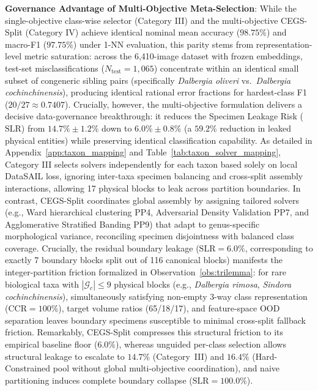 \documentclass[a4paper,fleqn]{cas-sc}
\begin{document}
\textbf{Governance Advantage of Multi-Objective Meta-Selection}: While the single-objective class-wise selector (Category III) and the multi-objective CEGS-Split (Category IV) achieve identical nominal mean accuracy ($98.75\%$) and macro-F1 ($97.75\%$) under 1-NN evaluation, this parity stems from representation-level metric saturation: across the 6,410-image dataset with frozen embeddings, test-set misclassifications ($N_{\text{test}} = 1{,}065$) concentrate within an identical small subset of congeneric sibling pairs (specifically \textit{Dalbergia oliveri} vs.\ \textit{Dalbergia cochinchinensis}), producing identical rational error fractions for hardest-class F1 ($20/27 \approx 0.7407$). Crucially, however, the multi-objective formulation delivers a decisive data-governance breakthrough: it reduces the Specimen Leakage Risk ($\mathrm{SLR}$) from $14.7\% \pm 1.2\%$ down to $6.0\% \pm 0.8\%$ (a $59.2\%$ reduction in leaked physical entities) while preserving identical classification capability. As detailed in Appendix~\ref{app:taxon_mapping} and Table~\ref{tab:taxon_solver_mapping}, Category III selects solvers independently for each taxon based solely on local DataSAIL loss, ignoring inter-taxa specimen balancing and cross-split assembly interactions, allowing 17 physical blocks to leak across partition boundaries. In contrast, CEGS-Split coordinates global assembly by assigning tailored solvers (e.g., Ward hierarchical clustering PP4, Adversarial Density Validation PP7, and Agglomerative Stratified Banding PP9) that adapt to genus-specific morphological variance, reconciling specimen disjointness with balanced class coverage. Crucially, the residual boundary leakage ($\mathrm{SLR} = 6.0\%$, corresponding to exactly 7 boundary blocks split out of 116 canonical blocks) manifests the integer-partition friction formalized in Observation~\ref{obs:trilemma}: for rare biological taxa with $|\mathcal{G}_c| \le 9$ physical blocks (e.g., \textit{Dalbergia rimosa}, \textit{Sindora cochinchinensis}), simultaneously satisfying non-empty 3-way class representation ($\mathrm{CCR}=100\%$), target volume ratios (65/18/17), and feature-space OOD separation leaves boundary specimens susceptible to minimal cross-split fallback friction. Remarkably, CEGS-Split compresses this structural friction to its empirical baseline floor ($6.0\%$), whereas unguided per-class selection allows structural leakage to escalate to $14.7\%$ (Category~III) and $16.4\%$ (Hard-Constrained pool without global multi-objective coordination), and naive partitioning induces complete boundary collapse ($\mathrm{SLR} = 100.0\%$).
\end{document}
